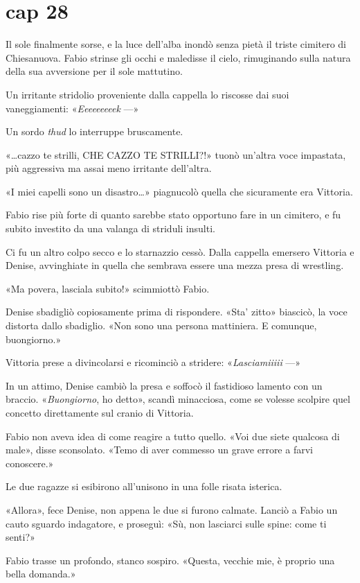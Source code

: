 \chapter{cap 28}

Il sole finalmente sorse, e la luce dell'alba inondò senza pietà il triste cimitero di Chiesanuova. Fabio strinse gli occhi e maledisse il cielo, rimuginando sulla natura della sua avversione per il sole
mattutino.

Un irritante stridolio proveniente dalla cappella lo riscosse dai suoi vaneggiamenti: «\emph{Eeeeeeeeek} ---»

Un sordo \emph{thud} lo interruppe bruscamente.

«\ldots{}cazzo te strilli, CHE CAZZO TE STRILLI?!» tuonò un'altra voce impastata, più aggressiva ma assai meno irritante dell'altra.

«I miei capelli sono un disastro\ldots{}» piagnucolò quella che sicuramente era Vittoria.

Fabio rise più forte di quanto sarebbe stato opportuno fare in un cimitero, e fu subito investito da una valanga di striduli insulti.

Ci fu un altro colpo secco e lo starnazzio cessò. Dalla cappella emersero Vittoria e Denise, avvinghiate in quella che sembrava essere una mezza presa di wrestling.

«Ma povera, lasciala subito!» scimmiottò Fabio.

Denise sbadigliò copiosamente prima di rispondere. «Sta' zitto» biascicò, la voce distorta dallo sbadiglio. «Non sono una persona mattiniera. E comunque, buongiorno.»

Vittoria prese a divincolarsi e ricominciò a stridere: «\emph{Lasciamiiiii} ---»

In un attimo, Denise cambiò la presa e soffocò il fastidioso lamento con un braccio. «\emph{Buongiorno}, ho detto», scandì minacciosa, come se volesse scolpire quel concetto direttamente sul cranio di Vittoria.

Fabio non aveva idea di come reagire a tutto quello. «Voi due siete qualcosa di male», disse sconsolato. «Temo di aver commesso un grave errore a farvi conoscere.»

Le due ragazze si esibirono all'unisono in una folle risata isterica.

«Allora», fece Denise, non appena le due si furono calmate. Lanciò a Fabio un cauto sguardo indagatore, e proseguì: «Sù, non lasciarci sulle spine: come ti senti?»

Fabio trasse un profondo, stanco sospiro. «Questa, vecchie mie, è proprio una bella domanda.»

